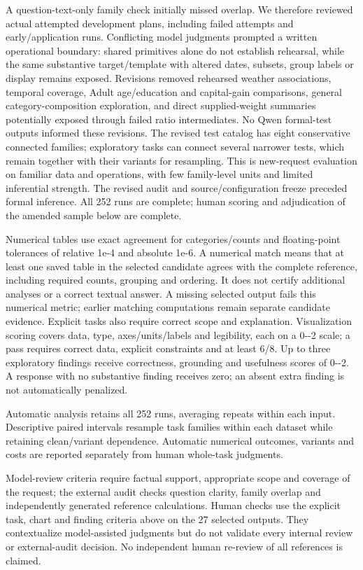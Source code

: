 A question-text-only family check initially missed overlap. We therefore reviewed actual attempted development plans, including failed attempts and early/application runs. Conflicting model judgments prompted a written operational boundary: shared primitives alone do not establish rehearsal, while the same substantive target/template with altered dates, subsets, group labels or display remains exposed. Revisions removed rehearsed weather associations, temporal coverage, Adult age/education and capital-gain comparisons, general category-composition exploration, and direct supplied-weight summaries potentially exposed through failed ratio intermediates. No Qwen formal-test outputs informed these revisions. The revised test catalog has eight conservative connected families; exploratory tasks can connect several narrower tests, which remain together with their variants for resampling. This is new-request evaluation on familiar data and operations, with few family-level units and limited inferential strength. The revised audit and source/configuration freeze preceded formal inference. All 252 runs are complete; human scoring and adjudication of the amended sample below are complete.

Numerical tables use exact agreement for categories/counts and floating-point tolerances of relative 1e-4 and absolute 1e-6. A numerical match means that at least one saved table in the selected candidate agrees with the complete reference, including required counts, grouping and ordering. It does not certify additional analyses or a correct textual answer. A missing selected output fails this numerical metric; earlier matching computations remain separate candidate evidence. Explicit tasks also require correct scope and explanation. Visualization scoring covers data, type, axes/units/labels and legibility, each on a 0-\/-2 scale; a pass requires correct data, explicit constraints and at least 6/8. Up to three exploratory findings receive correctness, grounding and usefulness scores of 0-\/-2. A response with no substantive finding receives zero; an absent extra finding is not automatically penalized.

Automatic analysis retains all 252 runs, averaging repeats within each input. Descriptive paired intervals resample task families within each dataset while retaining clean/variant dependence. Automatic numerical outcomes, variants and costs are reported separately from human whole-task judgments.

Model-review criteria require factual support, appropriate scope and coverage of the request; the external audit checks question clarity, family overlap and independently generated reference calculations. Human checks use the explicit task, chart and finding criteria above on the 27 selected outputs. They contextualize model-assisted judgments but do not validate every internal review or external-audit decision. No independent human re-review of all references is claimed.


